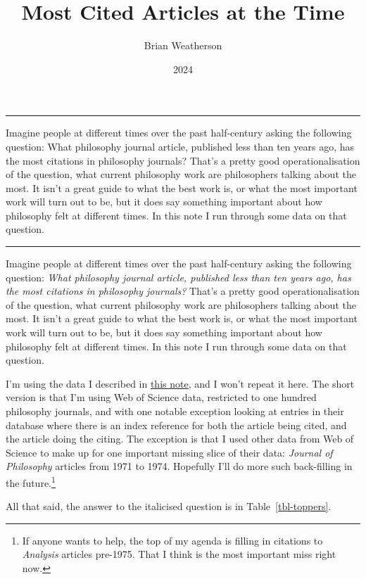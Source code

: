 \documentclass[
  10pt,
  letterpaper,
  DIV=11,
  numbers=noendperiod,
  twoside]{scrartcl}
\title{Most Cited Articles at the Time}
\author{Brian Weatherson}
\date{2024}
\renewenvironment{abstract}
 {\vspace{-1.25cm}
 \quotation\small\noindent\rule{\linewidth}{.5pt}\par\smallskip
 \noindent }
 {\par\noindent\rule{\linewidth}{.5pt}\endquotation}
\begin{document}
\maketitle
\begin{abstract}
Imagine people at different times over the past half-century asking the
following question: What philosophy journal article, published less than
ten years ago, has the most citations in philosophy journals? That's a
pretty good operationalisation of the question, what current philosophy
work are philosophers talking about the most. It isn't a great guide to
what the best work is, or what the most important work will turn out to
be, but it does say something important about how philosophy felt at
different times. In this note I run through some data on that question.
\end{abstract}


Imagine people at different times over the past half-century asking the
following question: \emph{What philosophy journal article, published
less than ten years ago, has the most citations in philosophy journals?}
That's a pretty good operationalisation of the question, what current
philosophy work are philosophers talking about the most. It isn't a
great guide to what the best work is, or what the most important work
will turn out to be, but it does say something important about how
philosophy felt at different times. In this note I run through some data
on that question.

I'm using the data I described in
\href{https://brian.weatherson.org/quarto/posts/citations/raw-data/citations.html}{this
note}, and I won't repeat it here. The short version is that I'm using
Web of Science data, restricted to one hundred philosophy journals, and
with one notable exception looking at entries in their database where
there is an index reference for both the article being cited, and the
article doing the citing. The exception is that I used other data from
Web of Science to make up for one important missing slice of their data:
\emph{Journal of Philosophy} articles from 1971 to 1974. Hopefully I'll
do more such back-filling in the future.\footnote{If anyone wants to
  help, the top of my agenda is filling in citations to \emph{Analysis}
  articles pre-1975. That I think is the most important miss right now.}

All that said, the answer to the italicised question is in
Table~\ref{tbl-toppers}.
\end{document}
